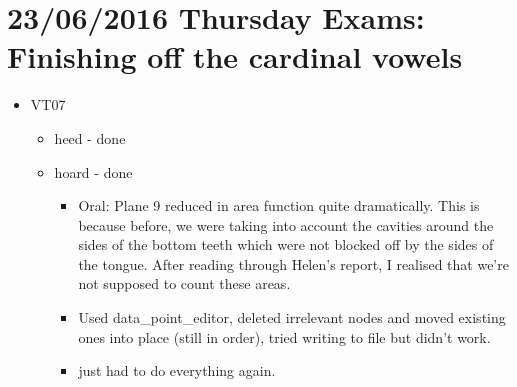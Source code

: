\documentclass{article}
\begin{document}
\section*{23/06/2016 Thursday Exams: Finishing off the cardinal vowels}
\begin{itemize}
    
    \item VT07
    \begin{itemize}
        \item heed - done
        \item hoard - done
        \begin{itemize}
            \item Oral: Plane 9 reduced in area function quite dramatically. This is because before, we were taking into account the cavities around the sides of the bottom teeth which were not blocked off by the sides of the tongue. After reading through Helen's report, I realised that we're not supposed to count these areas.
            \item Used data\_point\_editor, deleted irrelevant nodes and moved existing ones into place (still in order), tried writing to file but didn't work.
            \item just had to do everything again.
        \end{itemize}
    \end{itemize}
        
\end{itemize}
\end{document}
